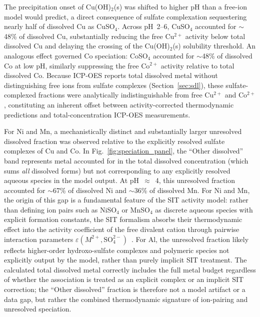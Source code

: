 \documentclass[final,2p,times]{elsarticle}
\begin{document}
The precipitation onset of Cu(OH)$_2$(s) was shifted to higher pH than a free-ion model would predict, a direct consequence of sulfate complexation sequestering nearly half of dissolved Cu as CuSO$_4$. Across pH~2--6, CuSO$_4$ accounted for $\sim$48\% of dissolved Cu, substantially reducing the free Cu$^{2+}$ activity below total dissolved Cu and delaying the crossing of the Cu(OH)$_2$(s) solubility threshold. An analogous effect governed Co speciation: CoSO$_4$ accounted for $\sim$48\% of dissolved Co at low pH, similarly suppressing the free Co$^{2+}$ activity relative to total dissolved Co. Because ICP-OES reports total dissolved metal without distinguishing free ions from sulfate complexes (Section~\ref{sec:sdl}), these sulfate-complexed fractions were analytically indistinguishable from free Cu$^{2+}$ and Co$^{2+}$, constituting an inherent offset between activity-corrected thermodynamic predictions and total-concentration ICP-OES measurements.

For Ni and Mn, a mechanistically distinct and substantially larger unresolved dissolved fraction was observed relative to the explicitly resolved sulfate complexes of Cu and Co. In Fig.~\ref{fig:speciation_panel}, the ``Other dissolved'' band represents metal accounted for in the total dissolved concentration (which sums \emph{all} dissolved forms) but not corresponding to any explicitly resolved aqueous species in the model output. At pH~$\approx$~4, this unresolved fraction accounted for $\sim$67\% of dissolved Ni and $\sim$36\% of dissolved Mn. For Ni and Mn, the origin of this gap is a fundamental feature of the SIT activity model: rather than defining ion pairs such as NiSO$_4$ or MnSO$_4$ as discrete aqueous species with explicit formation constants, the SIT formalism absorbs their thermodynamic effect into the activity coefficient of the free divalent cation through pairwise interaction parameters $\varepsilon(M^{2+}, \mathrm{SO_4^{2-}})$~\cite{guggenheim_specific_1955, noauthor_estimation_nodate}. For Al, the unresolved fraction likely reflects higher-order hydroxo-sulfate complexes and polymeric species not explicitly output by the model, rather than purely implicit SIT treatment. The calculated total dissolved metal correctly includes the full metal budget regardless of whether the association is treated as an explicit complex or an implicit SIT correction; the ``Other dissolved'' fraction is therefore not a model artifact or a data gap, but rather the combined thermodynamic signature of ion-pairing and unresolved speciation.
\end{document}

